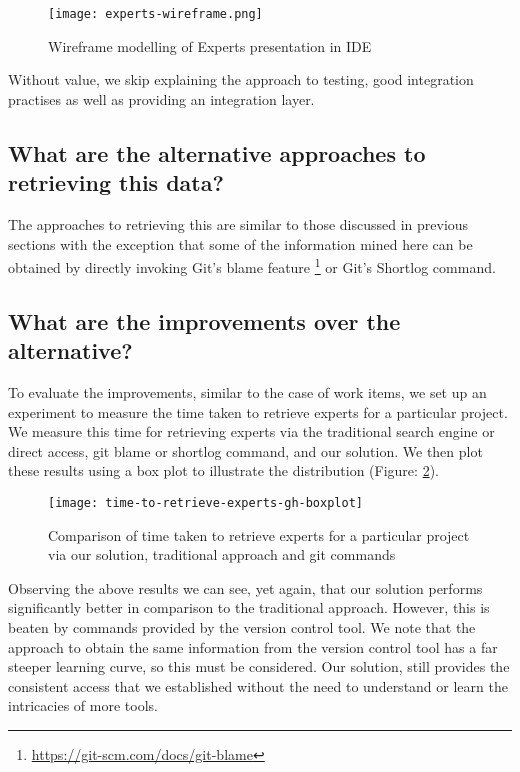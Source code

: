 \begin{figure}[h!]
	\centering
	\texttt{[image: experts-wireframe.png]}
	\caption{Wireframe modelling of Experts presentation in IDE}
	\label{fig:expertsWireframe}
\end{figure}

Without value, we skip explaining the approach to testing, good integration practises as well as providing an integration layer.

\subsection{What are the alternative approaches to retrieving this data?}

The approaches to retrieving this are similar to those discussed in previous sections with the exception that some of the information mined here can be obtained by directly invoking Git's blame feature \footnote{\url{https://git-scm.com/docs/git-blame}} or Git's Shortlog command.

\subsection{What are the improvements over the alternative?}

To evaluate the improvements, similar to the case of work items, we set up an experiment to measure the time taken to retrieve experts for a particular project. We measure this time for retrieving experts via the traditional search engine or direct access, git blame or shortlog command, and our solution. We then plot these results using a box plot to illustrate the distribution (Figure: \ref{fig:time-to-retrieve-experts-gh-boxplot}).

\begin{figure}[h!]
	\centering
	\texttt{[image: time-to-retrieve-experts-gh-boxplot]}
	\caption{Comparison of time taken to retrieve experts for a particular project via our solution, traditional approach and git commands}
	\label{fig:time-to-retrieve-experts-gh-boxplot}
\end{figure}

Observing the above results we can see, yet again, that our solution performs significantly better in comparison to the traditional approach. However, this is beaten by commands provided by the version control tool. We note that the approach to obtain the same information from the version control tool has a far steeper learning curve, so this must be considered. Our solution, still provides the consistent access that we established without the need to understand or learn the intricacies of more tools.

